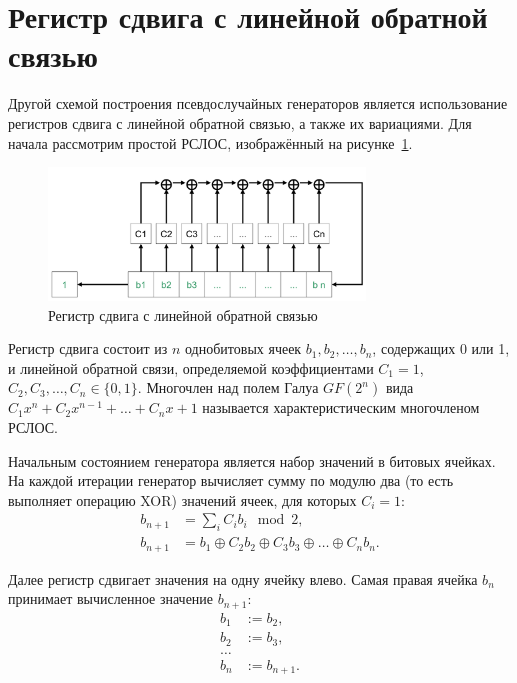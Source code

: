 \section[РСЛОС]{Регистр сдвига с линейной обратной связью}\label{section-lfsr}

Другой схемой построения псевдослучайных генераторов является использование регистров сдвига с линейной обратной связью, а также их вариациями. Для начала рассмотрим простой РСЛОС, изображённый на рисунке~\ref{fig:lfsr}.

\begin{figure}[thb]
	\centering
	\includegraphics[width=0.75\textwidth]{pic/lfsr}
	\caption{Регистр сдвига с линейной обратной связью}
	\label{fig:lfsr}
\end{figure}

Регистр сдвига состоит из $n$ однобитовых ячеек $b_1, b_2, \dots, b_n$, содержащих 0 или 1, и линейной обратной связи, определяемой коэффициентами $C_1 = 1$, $C_2, C_3, \dots, C_n \in \{0, 1\}$. Многочлен над полем Галуа $GF(2^n)$ вида $C_1 x^n + C_2 x^{n-1} + \dots + C_n x + 1$ называется характеристическим многочленом РСЛОС.

Начальным состоянием генератора является набор значений в битовых ячейках. На каждой итерации генератор вычисляет сумму по модулю два (то есть выполняет операцию XOR) значений ячеек, для которых $C_i=1$:
\[\begin{array}{ll}
	b_{n+1} &= \sum\limits_{i} C_i b_i \mod 2, \\
	b_{n+1} &= b_1 \oplus C_2 b_2 \oplus C_3 b_3 \oplus \dots \oplus C_n b_n.
\end{array}\]

Далее регистр сдвигает значения на одну ячейку влево. Самая правая ячейка $b_n$ принимает вычисленное значение $b_{n+1}$:
\[\begin{array}{ll}
	b_1 & := b_2, \\
	b_2 & := b_3, \\
	\dots \\
	b_n & := b_{n+1}. \\
\end{array}
\]

